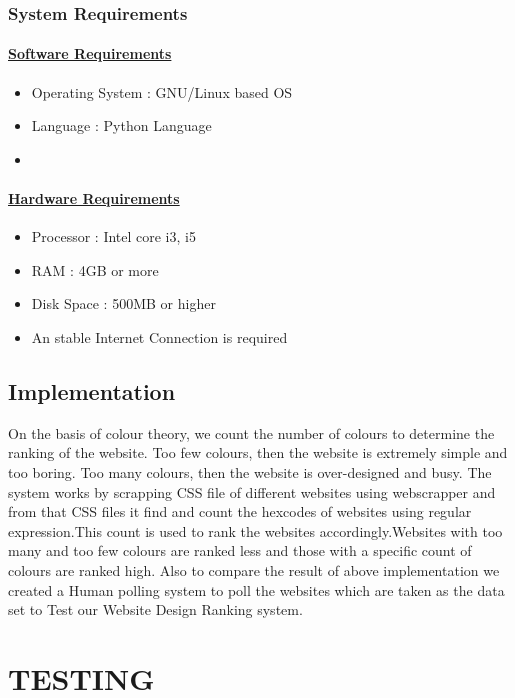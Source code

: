 \documentclass{fisatproject}
\begin{document}
\subsection{System Requirements}
\subsubsection{\underline{Software Requirements}}
\begin{itemize}
	\item Operating System : GNU/Linux based OS
	\item Language : Python Language
	\item 
\end{itemize}

\subsubsection{\underline{Hardware Requirements}}
\begin{itemize}
	\item Processor : Intel core i3, i5 
	\item RAM : 4GB or more
	\item Disk Space : 500MB or higher
	\item An stable Internet Connection is required
	
\end{itemize}

\section{Implementation}
On the basis of colour theory, we count the number of
colours to determine the ranking of the website.
Too few colours, then the website is extremely simple and too
boring.
Too many colours, then the website is over-designed and busy.
The system works by scrapping CSS file of different websites using webscrapper and from that CSS files it find and count the hexcodes of websites using regular expression.This count is used to rank the websites accordingly.Websites with too many and too few colours are ranked less and those with a specific count of colours are ranked high. 
Also to compare the result of above implementation we created a Human polling system to poll the websites which are taken as the data set to Test our Website Design Ranking system. 
\chapter{TESTING}
\end{document}
